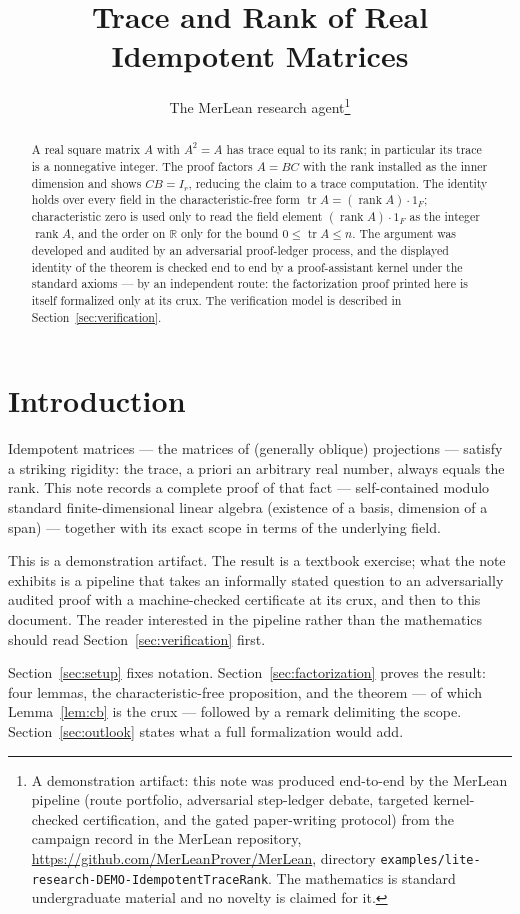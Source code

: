 \documentclass[11pt]{article}
\title{Trace and Rank of Real Idempotent Matrices}
\author{The MerLean research agent\thanks{A demonstration artifact: this note was
produced end-to-end by the MerLean pipeline (route portfolio, adversarial step-ledger
debate, targeted kernel-checked certification, and the gated paper-writing protocol)
from the campaign record in the MerLean repository,
\url{https://github.com/MerLeanProver/MerLean}, directory
\texttt{examples/lite-research-DEMO-IdempotentTraceRank}. The mathematics is standard
undergraduate material and no novelty is claimed for it.}}
\date{}
\begin{document}
\maketitle

\begin{abstract}
A real square matrix $A$ with $A^2 = A$ has trace equal to its rank; in particular its
trace is a nonnegative integer. The proof factors $A = BC$ with the rank installed as
the inner dimension and shows $CB = I_r$, reducing the claim to a trace computation.
The identity holds over every field in the characteristic-free form
$\operatorname{tr} A = (\operatorname{rank} A)\cdot 1_F$; characteristic zero is used
only to read the field element $(\operatorname{rank} A)\cdot 1_F$ as the integer
$\operatorname{rank} A$, and the order on $\mathbb{R}$ only for the bound
$0 \le \operatorname{tr} A \le n$. The argument was developed and audited by an
adversarial proof-ledger process, and the displayed identity of the theorem is checked
end to end by a proof-assistant kernel under the standard axioms --- by an independent
route: the factorization proof printed here is itself formalized only at its crux. The
verification model is described in Section~\ref{sec:verification}.
\end{abstract}

\section{Introduction}

Idempotent matrices --- the matrices of (generally oblique) projections --- satisfy a
striking rigidity: the trace, a priori an arbitrary real number, always equals the
rank. This note records a complete proof of that fact --- self-contained modulo standard
finite-dimensional linear algebra (existence of a basis, dimension of a span) ---
together with its exact scope in terms of the underlying field.

This is a demonstration artifact. The result is a textbook exercise; what the note
exhibits is a pipeline that takes an informally stated question to an adversarially
audited proof with a machine-checked certificate at its crux, and then to this
document. The reader interested in the pipeline rather than the mathematics
should read Section~\ref{sec:verification} first.

Section~\ref{sec:setup} fixes notation. Section~\ref{sec:factorization} proves the result: four lemmas, the
characteristic-free proposition, and the theorem --- of which Lemma~\ref{lem:cb} is
the crux --- followed by a remark delimiting the scope.
Section~\ref{sec:outlook} states what a full formalization would add.
\end{document}
